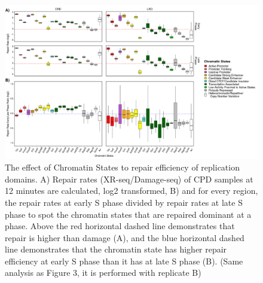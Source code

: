 \begin{figure}[H]
\begin{center}
\includegraphics[width=\textwidth]{Chapters/7_appendix/figures/supfig15}
\caption[The effect of Chromatin States to repair efficiency of replication domains for CPD samples at 12 minutes (replicate B).]{The effect of Chromatin States to repair efficiency of replication domains. A) Repair rates (XR-seq/Damage-seq) of CPD samples at 12 minutes are calculated, log2 transformed, B) and for every region, the repair rates at early S phase divided by repair rates at late S phase to spot the chromatin states that are repaired dominant at a phase. Above the red horizontal dashed line demonstrates that repair is higher than damage (A), and the blue horizontal dashed line demonstrates that the chromatin state has higher repair efficiency at early S phase than it has at late S phase (B). (Same analysis as Figure 3, it is performed with replicate B)}
\label{supfig:chromatin3}
\end{center}
\end{figure}

